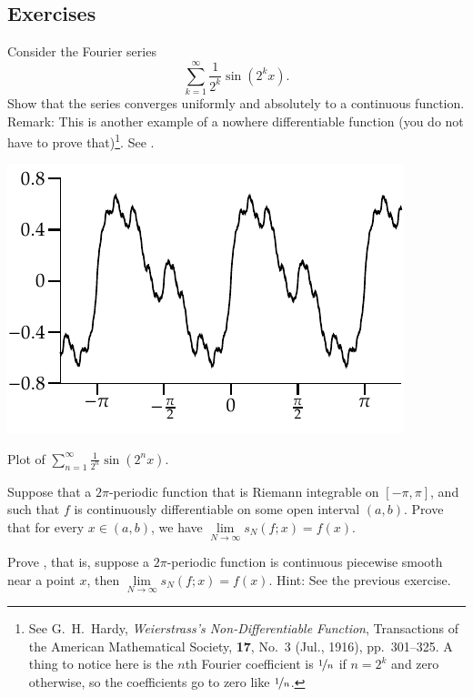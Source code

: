 \subsection{Exercises}

\begin{exercise} \label{exercise:fsweierser}
Consider the Fourier series
\begin{equation*}
\sum_{k=1}^\infty \frac{1}{2^k} \sin(2^k x) .
\end{equation*}
Show that the series converges uniformly and absolutely to a continuous
function.  Remark: This is another example of a nowhere differentiable
function (you do not have to prove that)\footnote{%
See
G.\ H.\ Hardy, \emph{Weierstrass's Non-Differentiable Function},
Transactions of the American Mathematical Society,
\textbf{17}, No.\ 3 (Jul., 1916), pp.\ 301--325.
A thing to notice here is the $n$th Fourier coefficient is $\nicefrac{1}{n}$
if $n=2^k$ and zero otherwise, so the coefficients go to zero like
$\nicefrac{1}{n}$.}.
See .
\begin{myfigureht}
\includegraphics{figures/fourierserweier}
\caption{Plot of 
$\sum_{n=1}^\infty \frac{1}{2^n} \sin(2^n x)$.\label{fig:fourierserweier}}
\end{myfigureht}
\end{exercise}

\begin{exercise}
Suppose that a $2\pi$-periodic function that is Riemann integrable
on $[-\pi,\pi]$, and such that $f$ is continuously differentiable
on some open interval $(a,b)$.  Prove that
for every $x \in (a,b)$, we have $\lim\limits_{N\to\infty} s_N(f;x) = f(x)$.
\end{exercise}

\begin{exercise}
Prove , that is,
suppose a $2\pi$-periodic function is continuous piecewise
smooth near a point $x$, then $\lim\limits_{N\to\infty} s_N(f;x) = f(x)$.  Hint: See the previous
exercise.
\end{exercise}

